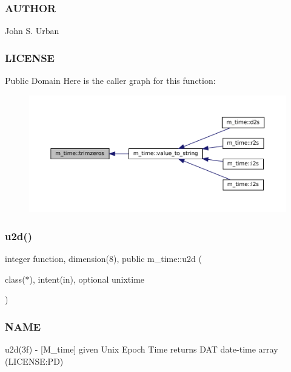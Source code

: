\subsubsection*{A\+U\+T\+H\+OR}

John S. Urban \subsubsection*{L\+I\+C\+E\+N\+SE}

Public Domain Here is the caller graph for this function\+:\nopagebreak
\begin{figure}[H]
\begin{center}
\leavevmode
\includegraphics[width=350pt]{namespacem__time_a5d9e4a12c3418d67dc69a87780053d67_icgraph}
\end{center}
\end{figure}
\mbox{\label{namespacem__time_a083bc231f8ba1879d7f86ab424e77d6c}} 
\subsubsection{\texorpdfstring{u2d()}{u2d()}}
{\footnotesize\ttfamily integer function, dimension(8), public m\+\_\+time\+::u2d (\begin{DoxyParamCaption}\item[{class($\ast$), intent(in), optional}]{unixtime }\end{DoxyParamCaption})}



\subsubsection*{N\+A\+ME}

u2d(3f) -\/ \mbox{[}M\+\_\+time\mbox{]} given Unix Epoch Time returns D\+AT date-\/time array (L\+I\+C\+E\+N\+SE\+:PD) 

